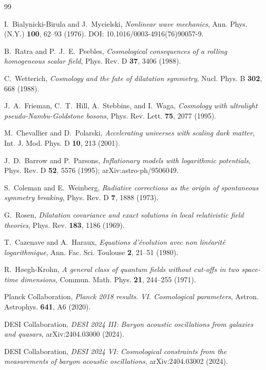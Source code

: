 \documentclass[11pt,reqno]{amsart}
\theoremstyle{plain}
\theoremstyle{definition}
\theoremstyle{remark}
\begin{document}
\begin{thebibliography}{99}

I.~Bialynicki-Birula and J.~Mycielski,
\emph{Nonlinear wave mechanics},
Ann. Phys. (N.Y.) \textbf{100}, 62--93 (1976).
DOI: 10.1016/0003-4916(76)90057-9.

B.~Ratra and P.~J.~E.~Peebles,
\emph{Cosmological consequences of a rolling homogeneous scalar field},
Phys. Rev. D \textbf{37}, 3406 (1988).

C.~Wetterich,
\emph{Cosmology and the fate of dilatation symmetry},
Nucl. Phys. B \textbf{302}, 668 (1988).

J.~A.~Frieman, C.~T.~Hill, A.~Stebbins, and I.~Waga,
\emph{Cosmology with ultralight pseudo-Nambu-Goldstone bosons},
Phys. Rev. Lett. \textbf{75}, 2077 (1995).

M.~Chevallier and D.~Polarski,
\emph{Accelerating universes with scaling dark matter},
Int. J. Mod. Phys. D \textbf{10}, 213 (2001).

J.~D.~Barrow and P.~Parsons,
\emph{Inflationary models with logarithmic potentials},
Phys. Rev. D \textbf{52}, 5576 (1995); arXiv:astro-ph/9506049.

S.~Coleman and E.~Weinberg,
\emph{Radiative corrections as the origin of spontaneous symmetry breaking},
Phys. Rev. D \textbf{7}, 1888 (1973).

G.~Rosen,
\emph{Dilatation covariance and exact solutions in local relativistic field theories},
Phys. Rev. \textbf{183}, 1186 (1969).

T.~Cazenave and A.~Haraux,
\emph{Equations d'\'evolution avec non lin\'earit\'e logarithmique},
Ann. Fac. Sci. Toulouse \textbf{2}, 21--51 (1980).

R.~H\o egh-Krohn,
\emph{A general class of quantum fields without cut-offs in two space-time dimensions},
Commun. Math. Phys. \textbf{21}, 244--255 (1971).

Planck Collaboration,
\emph{Planck 2018 results. VI. Cosmological parameters},
Astron. Astrophys. \textbf{641}, A6 (2020).

DESI Collaboration,
\emph{DESI 2024 III: Baryon acoustic oscillations from galaxies and quasars},
arXiv:2404.03000 (2024).

DESI Collaboration,
\emph{DESI 2024 VI: Cosmological constraints from the measurements of baryon acoustic oscillations},
arXiv:2404.03002 (2024).


\end{thebibliography}
\end{document}
